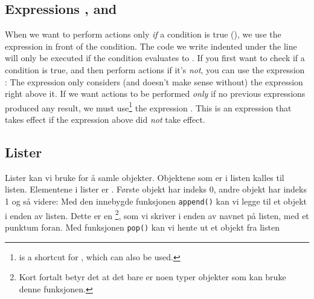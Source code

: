 \subsection{Expressions , and }
When we want to perform actions only \textsl{if} a condition is true (), we use the expression  in front of the condition. The code we write indented under the  line will only be executed if the condition evaluates to .
If you first want to check if a condition is true, and then perform actions if it's \textsl{not}, you can use the expression :
The expression  only considers (and doesn't make sense without) the  expression right above it. If we want actions to be performed \textsl{only} if no previous  expressions produced any result, we must use\footnote{ is a shortcut for , which can also be used.} the expression . This is an  expression that takes effect if the  expression above did \textsl{not} take effect.
\newpage

\subsection{Lister}
Lister kan vi bruke for å samle objekter. Objektene som er i listen kalles  til listen.
Elementene i lister er . Første objekt har indeks 0, andre objekt har indeks 1 og så videre:
Med den innebygde funksjonen \texttt{append()} kan vi legge til et objekt i enden av listen. Dette er en \footnote{Kort fortalt betyr det at det bare er noen typer objekter som kan bruke denne funksjonen.}, som vi skriver i enden av navnet på listen, med et punktum foran.
\newpage
Med funksjonen \texttt{pop()} kan vi hente ut et objekt fra listen
 \vsk

